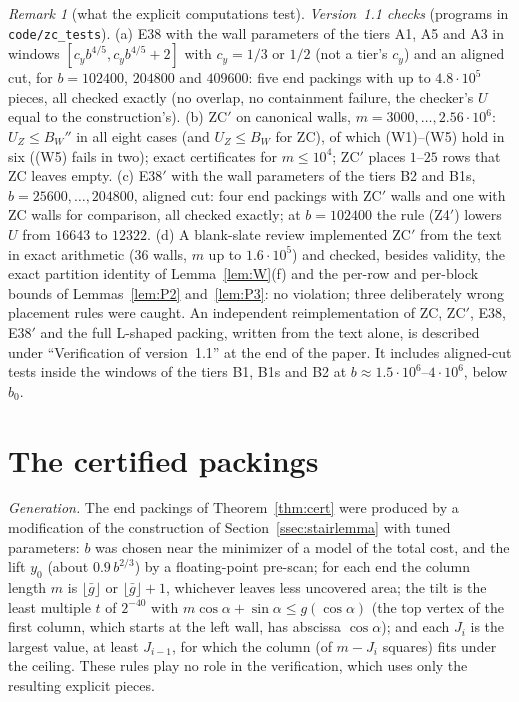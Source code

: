 \documentclass[11pt]{amsart}
\newcommand{\ca}{\cos\alpha}
\newcommand{\sa}{\sin\alpha}
\theoremstyle{definition}
\theoremstyle{remark}
\newtheorem{remark}[theorem]{Remark}
\numberwithin{equation}{section}
\begin{document}
\begin{remark}[what the explicit computations test]
\emph{Version~1.1 checks} (programs in \texttt{code/zc\_tests}). (a) E38 with the wall parameters of the tiers A1, A5 and
A3 in windows $[c_yb^{4/5},c_yb^{4/5}+2]$ with $c_y=1/3$ or $1/2$ (not a tier's $c_y$) and an aligned cut, for
$b=102400$, $204800$ and $409600$: five end packings with up to $4.8\cdot10^5$ pieces, all checked exactly (no overlap, no
containment failure, the checker's $U$ equal to the construction's).
(b) ZC$'$ on canonical walls, $m=3000,\dots,2.56\cdot10^6$: $U_Z\le B_W''$ in all eight cases (and $U_Z\le B_W$ for ZC), of which (W1)--(W5) hold in six ((W5) fails in two);
exact certificates for $m\le10^4$; ZC$'$ places $1$--$25$ rows that ZC leaves empty. (c) E38$'$ with the wall parameters
of the tiers B2 and B1s, $b=25600,\dots,204800$, aligned cut: four end packings with ZC$'$ walls and one with ZC walls
for comparison, all checked exactly; at $b=102400$ the
rule (Z4$'$) lowers $U$ from $16643$ to $12322$. (d) A blank-slate review implemented ZC$'$ from the text in exact
arithmetic ($36$ walls, $m$ up to $1.6\cdot10^5$) and checked, besides validity, the exact partition identity of
Lemma~\ref{lem:W}(f) and the per-row and per-block bounds of Lemmas~\ref{lem:P2} and~\ref{lem:P3}: no violation; three
deliberately wrong placement rules were caught.
An independent reimplementation of ZC, ZC$'$, E38, E38$'$ and the full L-shaped packing, written from the text alone,
is described under ``Verification of version~1.1'' at the end of the paper.
It includes aligned-cut tests inside the windows of the tiers B1, B1s and B2 at $b\approx1.5\cdot10^6$--$4\cdot10^6$,
below $b_0$.
\end{remark}

\section{The certified packings}\label{sec:cert}

\emph{Generation.} The end packings of Theorem~\ref{thm:cert} were produced by a modification of the construction of
Section~\ref{ssec:stairlemma} with tuned parameters: $b$ was chosen near the minimizer of a model of the total cost, and the lift $y_0$ (about
$0.9\,b^{2/3}$) by a floating-point pre-scan; for each end the column length $m$ is $\lfloor\bar g\rfloor$ or $\lfloor\bar g\rfloor+1$,
whichever leaves less uncovered area; the tilt is the least multiple $t$ of $2^{-40}$ with
$m\ca+\sa\le g(\ca)$ (the top vertex of the first column, which starts at the left wall, has abscissa $\ca$); and each $J_i$ is the largest value, at least $J_{i-1}$, for which the column (of $m-J_i$ squares) fits under the ceiling.
These rules play no role in the verification, which uses only the resulting explicit pieces.
\end{document}
